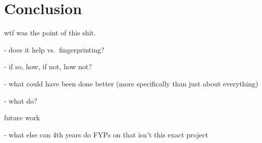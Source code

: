 \chapter{Conclusion}

wtf was the point of this shit.

- does it help vs.\ fingerprinting?

- if so, how, if not, how not?

- what could have been done better (more specifically than just about everything)

- what do?

future work

- what else can 4th years do FYPs on that isn't this exact project

